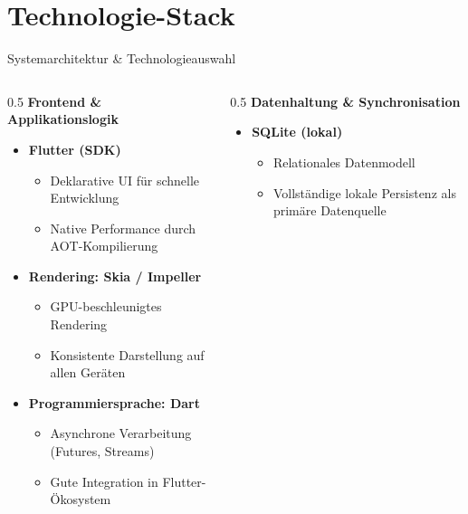 \documentclass[10pt]{beamer}
\begin{document}

\section{Technologie-Stack}

\begin{frame}{Systemarchitektur \& Technologieauswahl}
    \begin{columns}[T]
        \begin{column}{0.5\textwidth}
            \textbf{Frontend \& Applikationslogik}
            \begin{itemize}
                \item \textbf{Flutter (SDK)}
                \begin{itemize}
                    \item Deklarative UI für schnelle Entwicklung
                    \item Native Performance durch AOT-Kompilierung
                \end{itemize}
                
                \item \textbf{Rendering: Skia / Impeller}
                \begin{itemize}
                    \item GPU-beschleunigtes Rendering
                    \item Konsistente Darstellung auf allen Geräten
                \end{itemize}
                
                \item \textbf{Programmiersprache: Dart}
                \begin{itemize}
                    \item Asynchrone Verarbeitung (Futures, Streams)
                    \item Gute Integration in Flutter-Ökosystem
                \end{itemize}
            \end{itemize}
        \end{column}
        
        \begin{column}{0.5\textwidth}
            \textbf{Datenhaltung \& Synchronisation}
            \begin{itemize}
                \item \textbf{SQLite (lokal)}
                \begin{itemize}
                    \item Relationales Datenmodell
                    \item Vollständige lokale Persistenz als primäre Datenquelle
                \end{itemize}
                

\end{itemize}
\end{column}
\end{columns}
\end{frame}
\end{document}

